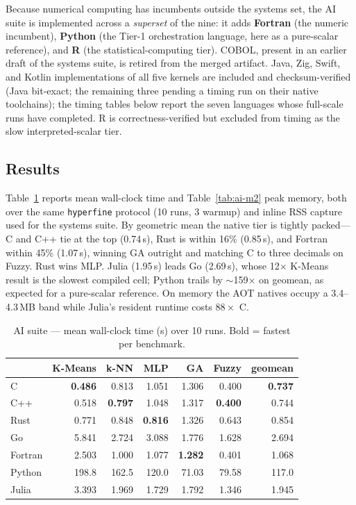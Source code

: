 \documentclass[10pt,conference]{IEEEtran}
\begin{document}
Because numerical computing has incumbents outside the systems set, the AI
suite is implemented across a \emph{superset} of the nine: it adds
\textbf{Fortran} (the numeric incumbent), \textbf{Python} (the Tier-1
orchestration language, here as a pure-scalar reference), and \textbf{R} (the
statistical-computing tier). COBOL, present in an earlier draft of the systems
suite, is retired from the merged artifact. Java, Zig, Swift, and Kotlin
implementations of all five kernels are included and checksum-verified
(Java bit-exact; the remaining three pending a timing run on their native
toolchains); the timing tables below report the seven languages whose
full-scale runs have completed. R is correctness-verified but excluded from
timing as the slow interpreted-scalar tier.

\subsection{Results}
Table~\ref{tab:ai-m1} reports mean wall-clock time and Table~\ref{tab:ai-m2}
peak memory, both over the same \texttt{hyperfine} protocol (10 runs, 3
warmup) and inline RSS capture used for the systems suite. By geometric mean
the native tier is tightly packed---C and C\nobreakspace++ tie at the top
(0.74\,s), Rust is within 16\% (0.85\,s), and Fortran within 45\%
(1.07\,s), winning GA outright and matching C to three decimals on Fuzzy.
Rust wins MLP. Julia (1.95\,s) leads Go (2.69\,s), whose 12$\times$ K-Means
result is the slowest compiled cell; Python trails by $\sim$159$\times$ on
geomean, as expected for a pure-scalar reference. On memory the AOT natives
occupy a 3.4--4.3\,MB band while Julia's resident runtime costs $88\times$ C.

\begin{table}[t]
\caption{AI suite --- mean wall-clock time (s) over 10 runs. Bold = fastest per benchmark.}
\label{tab:ai-m1}\centering\small
\begin{tabular}{l*{5}{r}r}
\toprule
 & \textbf{K-Means} & \textbf{k-NN} & \textbf{MLP} & \textbf{GA} & \textbf{Fuzzy} & \textbf{geomean} \\ \midrule
C & \textbf{0.486} & 0.813 & 1.051 & 1.306 & 0.400 & \textbf{0.737} \\
C++ & 0.518 & \textbf{0.797} & 1.048 & 1.317 & \textbf{0.400} & 0.744 \\
Rust & 0.771 & 0.848 & \textbf{0.816} & 1.326 & 0.643 & 0.854 \\
Go & 5.841 & 2.724 & 3.088 & 1.776 & 1.628 & 2.694 \\
Fortran & 2.503 & 1.000 & 1.077 & \textbf{1.282} & 0.401 & 1.068 \\
Python & 198.8 & 162.5 & 120.0 & 71.03 & 79.58 & 117.0 \\
Julia & 3.393 & 1.969 & 1.729 & 1.792 & 1.346 & 1.945 \\
\bottomrule\end{tabular}\end{table}
\end{document}
